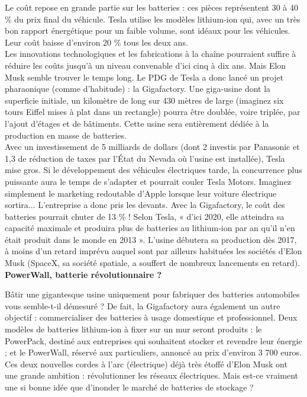\documentclass[8pt]{article}
\begin{document}
Le coût repose en grande partie sur les batteries : ces pièces représentent 30 à 40 \% du prix final du véhicule. Tesla utilise les modèles lithium-ion qui, avec un très bon rapport énergétique pour un faible volume, sont idéaux pour les véhicules. Leur coût baisse d’environ 20 \% tous les deux ans. \\

Les innovations technologiques et les fabrications à la chaîne pourraient suffire à réduire les coûts jusqu’à un niveau convenable d’ici cinq à dix ans. Mais Elon Musk semble trouver le temps long. Le PDG de Tesla a donc lancé un projet pharaonique (comme d’habitude) : la Gigafactory. Une giga-usine dont la superficie initiale, un kilomètre de long sur 430 mètres de large (imaginez six tours Eiffel mises à plat dans un rectangle) pourra être doublée, voire triplée, par l’ajout d’étages et de bâtiments. Cette usine sera entièrement dédiée à la production en masse de batteries. \\


Avec un investissement de 5 milliards de dollars (dont 2 investis par Panasonic et 1,3 de réduction de taxes par l’État du Nevada où l’usine est installée), Tesla mise gros. Si le développement des véhicules électriques tarde, la concurrence plus puissante aura le temps de s’adapter et pourrait couler Tesla Motors. Imaginez simplement le marketing redoutable d’Apple lorsque leur voiture électrique sortira... L’entreprise a donc pris les devants. Avec la Gigafactory, le coût des batteries pourrait chuter de 13 \% ! Selon Tesla, « d’ici 2020, elle atteindra sa capacité maximale et produira plus de batteries au lithium-ion par an qu’il n’en était produit dans le monde en 2013 ». L’usine débutera sa production dès 2017, à moins d’un retard imprévu auquel sont par ailleurs habituées les sociétés d’Elon Musk (SpaceX, sa société spatiale, a souffert de nombreux lancements en retard). \\

\textbf{PowerWall, batterie révolutionnaire ?}

Bâtir une gigantesque usine uniquement pour fabriquer des batteries automobiles vous semble-t-il démesuré ? De fait, la Gigafactory aura également un autre objectif : commercialiser des batteries à usage domestique et professionnel. Deux modèles de batteries lithium-ion à fixer sur un mur seront produits : le PowerPack, destiné aux entreprises qui souhaitent stocker et revendre leur énergie ; et le PowerWall, réservé aux particuliers, annoncé au prix d’environ 3 700 euros. Ces deux nouvelles cordes à l’arc (électrique) déjà très étoffé d’Elon Musk ont une grande ambition : révolutionner les réseaux électriques. Mais est-ce vraiment une si bonne idée que d’inonder le marché de batteries de stockage ? \\
\end{document}
